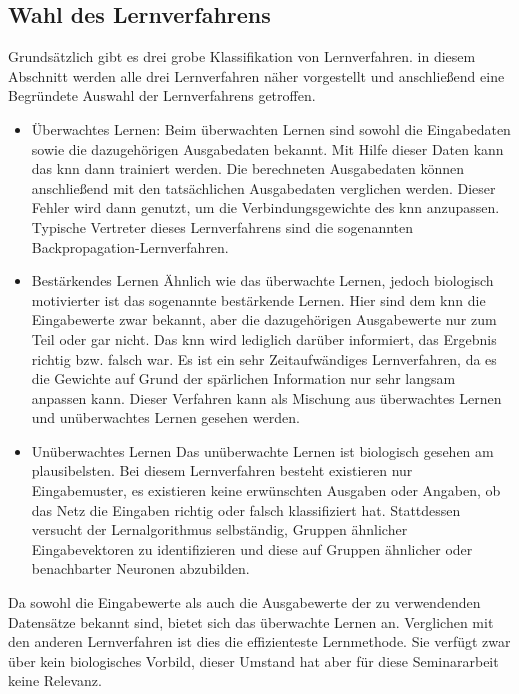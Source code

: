 \subsection{Wahl des Lernverfahrens} 
\label{subsection:Wahl des Lernverfahrens}

Grundsätzlich gibt es drei grobe Klassifikation von Lernverfahren. in diesem Abschnitt werden alle drei Lernverfahren näher vorgestellt und anschließend eine Begründete Auswahl der Lernverfahrens getroffen.

\begin{itemize}
\item Überwachtes Lernen: Beim überwachten Lernen sind sowohl die Eingabedaten sowie die dazugehörigen Ausgabedaten bekannt. Mit Hilfe dieser Daten kann das \ac{knn} dann trainiert werden. Die berechneten Ausgabedaten können anschließend mit den tatsächlichen Ausgabedaten verglichen werden. Dieser Fehler wird dann genutzt, um die Verbindungsgewichte des \ac{knn} anzupassen. Typische Vertreter dieses Lernverfahrens sind die sogenannten Backpropagation-Lernverfahren.
	
\item Bestärkendes Lernen
Ähnlich wie das überwachte Lernen, jedoch biologisch motivierter ist  das sogenannte bestärkende Lernen. Hier sind dem \ac{knn} die Eingabewerte zwar bekannt, aber die dazugehörigen Ausgabewerte nur zum Teil oder gar nicht. Das \ac{knn} wird lediglich darüber informiert, das Ergebnis richtig bzw. falsch war. Es ist ein sehr Zeitaufwändiges Lernverfahren, da es die Gewichte auf Grund der spärlichen Information nur sehr langsam anpassen kann. Dieser Verfahren kann als Mischung aus überwachtes Lernen und unüberwachtes Lernen gesehen werden.

\item Unüberwachtes Lernen
Das unüberwachte Lernen ist biologisch gesehen am plausibelsten. Bei diesem  Lernverfahren besteht existieren nur Eingabemuster, es existieren keine erwünschten Ausgaben oder Angaben, ob das Netz die Eingaben richtig oder falsch klassifiziert hat. Stattdessen versucht der Lernalgorithmus selbständig, Gruppen ähnlicher Eingabevektoren zu identifizieren und diese auf Gruppen ähnlicher oder benachbarter Neuronen abzubilden. 
\end{itemize}


Da sowohl die Eingabewerte als auch die Ausgabewerte der zu verwendenden Datensätze bekannt sind, bietet sich das überwachte Lernen an. Verglichen mit den anderen Lernverfahren ist dies die effizienteste Lernmethode. Sie verfügt zwar über kein biologisches Vorbild, dieser Umstand hat aber für diese Seminararbeit keine Relevanz.

